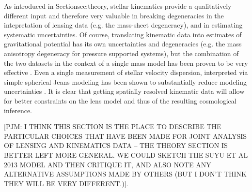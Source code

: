 As introduced in Section{sec:theory},
stellar kinematics provide a qualitatively different input and
therefore very valuable in breaking degeneracies in the intepretation
of lensing data (e.g. the mass-sheet degeneracy), and in estimating
systematic uncertainties. Of course, translating kinematic data into
estimates of gravitational potential has its own uncertainties and
degeneracies (e.g. the mass anisotropy degeneracy for pressure
supported systems), but the combination of the two datasets
in the context of a single mass model
has been proven to be very effective
\citep{T+K04}. Even a single measurement of stellar velocity dispersion,
interpreted via
simple spherical Jeans modeling has been shown to substantially
reduce modeling uncertainties \citep{T+K02,Koo++03,Suy++14}. It is
clear that getting spatially resolved kinematic data will allow for
better constraints on the lens model and thus of the resulting
cosmological inference.

[PJM: I THINK THIS SECTION IS THE PLACE TO DESCRIBE THE PARTICULAR
CHOICES THAT HAVE BEEN MADE FOR JOINT ANALYSIS OF LENSING AND KINEMATICS
DATA --  THE THEORY SECTION IS BETTER LEFT MORE GENERAL. WE COULD SKETCH
THE SUYU ET AL 2013 MODEL AND THEN CRITIQUE IT, AND ALSO NOTE ANY
ALTERNATIVE ASSUMPTIONS MADE BY OTHERS (BUT I DON'T THINK THEY WILL BE
VERY DIFFERENT.)].
